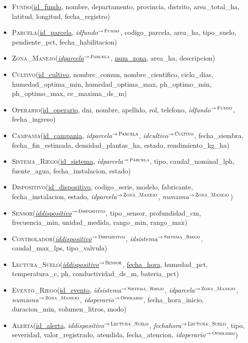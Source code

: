 \documentclass[11pt,letterpaper]{article}
\newcommand{\tbus}{\textunderscore\allowbreak}
\newcommand{\pk}[1]{\underline{#1}}
\newcommand{\fk}[2]{{\itshape\let\_\tbus #1}$^{\to\,\textsc{\let\_\tbus #2}}$}
\begin{document}
\begin{itemize}[leftmargin=1.2em,itemsep=0.3em]\raggedright
\item \textsc{Fundo}(\pk{id\_fundo}, nombre, departamento, provincia, distrito, area\_total\_ha, latitud, longitud, fecha\_registro)
\item \textsc{Parcela}(\pk{id\_parcela}, \fk{id\_fundo}{Fundo}, codigo\_parcela, area\_ha, tipo\_suelo, pendiente\_pct, fecha\_habilitacion)
\item \textsc{Zona\_Manejo}(\pk{\fk{id\_parcela}{Parcela}}, \pk{num\_zona}, area\_ha, descripcion)
\item \textsc{Cultivo}(\pk{id\_cultivo}, nombre\_comun, nombre\_cientifico, ciclo\_dias, humedad\_optima\_min, humedad\_optima\_max, ph\_optimo\_min, ph\_optimo\_max, ce\_maxima\_ds\_m)
\item \textsc{Operario}(\pk{id\_operario}, dni, nombre, apellido, rol, telefono, \fk{id\_fundo}{Fundo}, fecha\_ingreso)
\item \textsc{Campania}(\pk{id\_campania}, \fk{id\_parcela}{Parcela}, \fk{id\_cultivo}{Cultivo}, fecha\_siembra, fecha\_fin\_estimada, densidad\_plantas\_ha, estado, rendimiento\_kg\_ha)
\item \textsc{Sistema\_Riego}(\pk{id\_sistema}, \fk{id\_parcela}{Parcela}, tipo, caudal\_nominal\_lph, fuente\_agua, fecha\_instalacion, estado)
\item \textsc{Dispositivo}(\pk{id\_dispositivo}, codigo\_serie, modelo, fabricante, fecha\_instalacion, estado, \fk{id\_parcela}{Zona\_Manejo}, \fk{num\_zona}{Zona\_Manejo})
\item \textsc{Sensor}(\pk{\fk{id\_dispositivo}{Dispositivo}}, tipo\_sensor, profundidad\_cm, frecuencia\_min, unidad\_medida, rango\_min, rango\_max)
\item \textsc{Controlador}(\pk{\fk{id\_dispositivo}{Dispositivo}}, \fk{id\_sistema}{Sistema\_Riego}, caudal\_max\_lps, tipo\_valvula)
\item \textsc{Lectura\_Suelo}(\pk{\fk{id\_dispositivo}{Sensor}}, \pk{fecha\_hora}, humedad\_pct, temperatura\_c, ph, conductividad\_ds\_m, bateria\_pct)
\item \textsc{Evento\_Riego}(\pk{id\_evento}, \fk{id\_sistema}{Sistema\_Riego}, \fk{id\_parcela}{Zona\_Manejo}, \fk{num\_zona}{Zona\_Manejo}, \fk{id\_operario}{Operario}, fecha\_hora\_inicio, duracion\_min, volumen\_litros, modo)
\item \textsc{Alerta}(\pk{id\_alerta}, \fk{id\_dispositivo}{Lectura\_Suelo}, \fk{fecha\_hora}{Lectura\_Suelo}, tipo, severidad, valor\_registrado, atendida, fecha\_atencion, \fk{id\_operario}{Operario})

\end{itemize}
\end{document}
